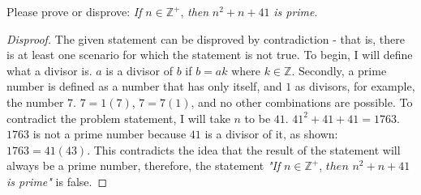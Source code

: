 \documentclass[12pt]{article}
\newenvironment{problem}[2][Problem]{\begin{trivlist}
\item[\hskip \labelsep {\bfseries #1}\hskip \labelsep {\bfseries #2.}]}{\end{trivlist}}
\begin{document}
\begin{problem}{4}
Please prove or disprove: \textit{If} $n \in\mathbb{Z}^+$, \textit{then} $n^2 + n + 41$ \textit{is prime}.
\end{problem}

\begin{proof}[Disproof]
The given statement can be disproved by contradiction - that is, there is at least one scenario for which the statement is not true.
To begin, I will define what a divisor is. $a$ is a divisor of $b$ if $b = ak$ where $k \in\mathbb{Z}$. Secondly, a prime number is defined as a number that has only itself, and $1$ as divisors, for example, the number $7$. $7 = 1(7)$, $7 = 7(1)$, and no other combinations are possible. To contradict the problem statement, I will take $n$ to be $41$. $41^2 + 41 + 41 = 1763$. $1763$ is not a prime number because $41$ is a divisor of it, as shown: $1763 = 41(43)$. This contradicts the idea that the result of the statement will always be a prime number, therefore, the statement \textit{"If} $n \in\mathbb{Z^+}$, $then$ $n^2 + n + 41$ \textit{is prime"} is false.
\end{proof}
\end{document}
